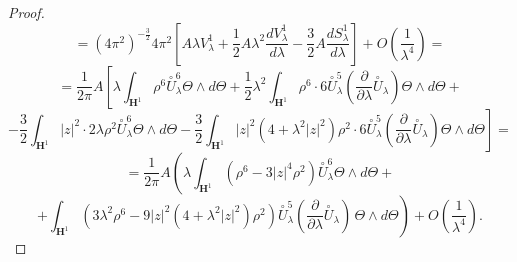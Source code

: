 \documentclass[10pt,a4paper]{amsart}
\newcommand{\de}{\partial}
\renewcommand{\H}{\mathbf{H}}
\renewcommand{\l}{\lambda }
\begin{document}
\begin{proof}
$$= (4\pi^2)^{-\frac{3}{2}}4\pi^2\left[A\lambda V_{\lambda}^1 + \frac{1}{2}A\lambda^2\frac{dV_{\lambda}^1}{d\lambda} - \frac{3}{2}A\frac{dS^1_{\lambda}}{d\lambda} \right] +O\left(\frac{1}{\lambda^4}\right) =$$
$$= \frac{1}{2\pi}A\left[\lambda\int_{\H^1} \rho^6 \overset{\circ}{U}_\l^6\Theta\wedge d\Theta + \frac{1}{2}\lambda^2\int_{\H^1}\rho^6 \cdot6\overset{\circ}{U}_\l^5\left(\frac{\de}{\de \lambda}\overset{\circ}{U}_\l\right)\Theta\wedge d\Theta +\right.$$
$$\left.-\frac{3}{2} \int_{\H^1} |z|^2\cdot 2\lambda\rho^2 \overset{\circ}{U}_\lambda^6\Theta\wedge d\Theta -\frac{3}{2} \int_{\H^1} |z|^2 (4 + \lambda^2 |z|^2) \rho^2 \cdot 6\overset{\circ}{U}_\lambda^5\left(\frac{\de}{\de \lambda}\overset{\circ}{U}_\l\right)\Theta\wedge d\Theta\right]=$$
$$= \frac{1}{2\pi}A\left( \l \int_{\H^1} \left(\rho^6 -3|z|^4 \rho^2\right)\overset{\circ}{U}_\l^6 \Theta\wedge d\Theta+ \right.$$
 $$\left.+  \int_{\H^1}\left(3\lambda^2\rho^6 -9|z|^2 (4 + \lambda^2 |z|^2) \rho^2\right) \overset{\circ}{U}_\lambda^5\left(\frac{\de}{\de\lambda}\overset{\circ}{U}_{\lambda} \right) \, \Theta\wedge d\Theta\right) +O\left(\frac{1}{\lambda^4}\right).$$


\end{proof}
\end{document}
